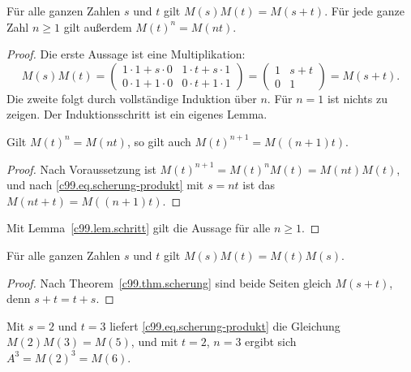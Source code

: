 \begin{theorem}\label{c99.thm.scherung}
  Für alle ganzen Zahlen $s$ und $t$ gilt $M(s)M(t) = M(s+t)$. Für jede ganze Zahl
  $n \geq 1$ gilt außerdem $M(t)^n = M(nt)$.
\end{theorem}
\begin{proof}
  Die erste Aussage ist eine Multiplikation:
  \begin{equation}\label{c99.eq.scherung-produkt}
    M(s)M(t)
    = \begin{pmatrix} 1\cdot 1 + s\cdot 0 & 1\cdot t + s\cdot 1 \\
                      0\cdot 1 + 1\cdot 0 & 0\cdot t + 1\cdot 1 \end{pmatrix}
    = \begin{pmatrix} 1 & s+t \\ 0 & 1 \end{pmatrix}
    = M(s+t).
  \end{equation}
  Die zweite folgt durch vollständige Induktion über $n$. Für $n = 1$ ist nichts
  zu zeigen. Der Induktionsschritt ist ein eigenes Lemma.
  \begin{lemma}[Induktionsschritt]\label{c99.lem.schritt}
    Gilt $M(t)^n = M(nt)$, so gilt auch $M(t)^{n+1} = M((n+1)t)$.
  \end{lemma}
  \begin{proof}
    Nach Voraussetzung ist $M(t)^{n+1} = M(t)^n M(t) = M(nt)M(t)$, und nach
    \eqref{c99.eq.scherung-produkt} mit $s = nt$ ist das $M(nt + t) = M((n+1)t)$.
  \end{proof}
  Mit Lemma~\ref{c99.lem.schritt} gilt die Aussage für alle $n \geq 1$.
\end{proof}

\begin{corollary}\label{c99.cor.vertauschen}
  Für alle ganzen Zahlen $s$ und $t$ gilt $M(s)M(t) = M(t)M(s)$.
\end{corollary}
\begin{proof}
  Nach Theorem~\ref{c99.thm.scherung} sind beide Seiten gleich $M(s+t)$, denn
  $s + t = t + s$.
\end{proof}

\begin{example}[Zahlenbeispiel]\label{c99.ex.zahlen}
  Mit $s = 2$ und $t = 3$ liefert \eqref{c99.eq.scherung-produkt} die Gleichung
  $M(2)M(3) = M(5)$, und mit $t = 2$, $n = 3$ ergibt sich $A^3 = M(2)^3 = M(6)$.
\end{example}

